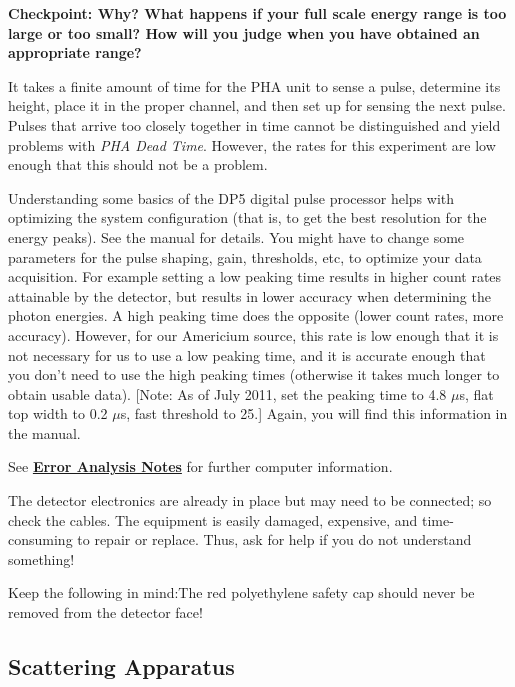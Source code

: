 \documentclass{../lab}
\begin{document}
\textbf{Checkpoint: Why? What happens if your full scale energy range is too large or too small? How will you judge when you have obtained an appropriate range?}

It takes a finite amount of time for the PHA unit to sense a pulse, determine its height, place it in the proper channel, and then set up for sensing the next pulse. Pulses that arrive too closely together in time cannot be distinguished and yield problems with \emph{PHA Dead Time}. However, the rates for this experiment are low enough that this should not be a problem.

Understanding some basics of the DP5 digital pulse processor helps with optimizing the system configuration (that is, to get the best resolution for the energy peaks). See the manual for details. You might have to change some parameters for the pulse shaping, gain, thresholds, etc, to optimize your data acquisition. For example setting a low peaking time results in higher count rates attainable by the detector, but results in lower accuracy when determining the photon energies. A high peaking time does the opposite (lower count rates, more accuracy). However, for our Americium source, this rate is low enough that it is not necessary for us to use a low peaking time, and it is accurate enough that you don't need to use the high peaking times (otherwise it takes much longer to obtain usable data). [Note: As of July 2011, set the peaking time to 4.8 $\mu$s, flat top width to 0.2 $\mu$s, fast threshold to 25.] Again, you will find this information in the manual.

See \href{\ErrorAnalysisNotes}{\textbf{\textbf{Error Analysis Notes}}} for further computer information.

The detector electronics are already in place but may need to be connected; so check the cables. The equipment is easily damaged, expensive, and time-consuming to repair or replace. Thus, ask for help if you do not understand something!

Keep the following in mind:The red polyethylene safety cap should never be removed from the detector face!

\subsection{Scattering Apparatus}
\end{document}
